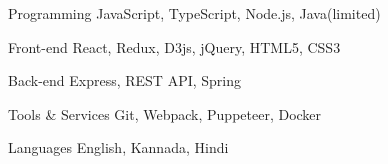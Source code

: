 

\begin{cvskills}

  \cvskill
  {Programming} %
  {JavaScript, TypeScript, Node.js, Java(limited)} %

  \cvskill
  {Front-end} %
  {React, Redux, D3js, jQuery, HTML5, CSS3} %

  \cvskill
  {Back-end} %
  {Express, REST API, Spring} %

  \cvskill
  {Tools \& Services} %
  {Git, Webpack, Puppeteer, Docker} %

  \cvskill
  {Languages} %
  {English, Kannada, Hindi} %

\end{cvskills}
